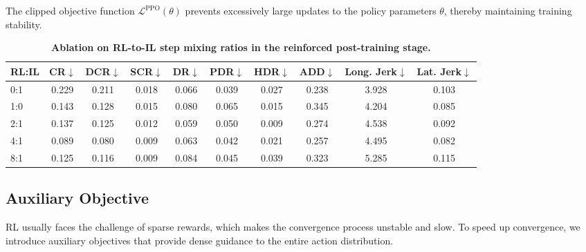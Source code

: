 The clipped objective function $\mathcal{L}^{\text{PPO}}(\theta)$ prevents excessively large updates to the policy parameters $\theta$, thereby maintaining training stability.

\begin{table*}[ht]
    \centering
{
\begin{tabular}{lccccccccc}
    \toprule
    RL:IL & CR$\downarrow$ & DCR$\downarrow$ & SCR$\downarrow$ & DR$\downarrow$ & PDR$\downarrow$ & HDR$\downarrow$ &ADD$\downarrow$ & Long. Jerk$\downarrow$ & Lat. Jerk$\downarrow$ \\
    \midrule
     0:1  & 0.229 & 0.211 & 0.018 & 0.066 & 0.039 & 0.027  & 0.238 & 3.928 & 0.103\\
     1:0  & 0.143 & 0.128 & 0.015 &0.080 &0.065 &0.015 &0.345 &4.204 &0.085\\
     2:1 & 0.137 & 0.125 & 0.012 & 0.059 & 0.050 & 0.009  & 0.274 & 4.538 & 0.092\\
     4:1 & 0.089 & 0.080 & 0.009 & 0.063 & 0.042 & 0.021  & 0.257 & 4.495 & 0.082 \\
     8:1 & 0.125 & 0.116 & 0.009 & 0.084 & 0.045 & 0.039  & 0.323 & 5.285 & 0.115\\
    \bottomrule
\end{tabular}
}
    \caption{\textbf{Ablation on RL-to-IL step mixing ratios in the reinforced post-training stage.}}
    \label{tab:ratio}
\end{table*}

\subsection{Auxiliary Objective}
RL usually faces the challenge of sparse rewards, which makes the convergence process unstable and slow. To speed up convergence, we introduce auxiliary objectives that provide dense guidance to the entire action distribution.

